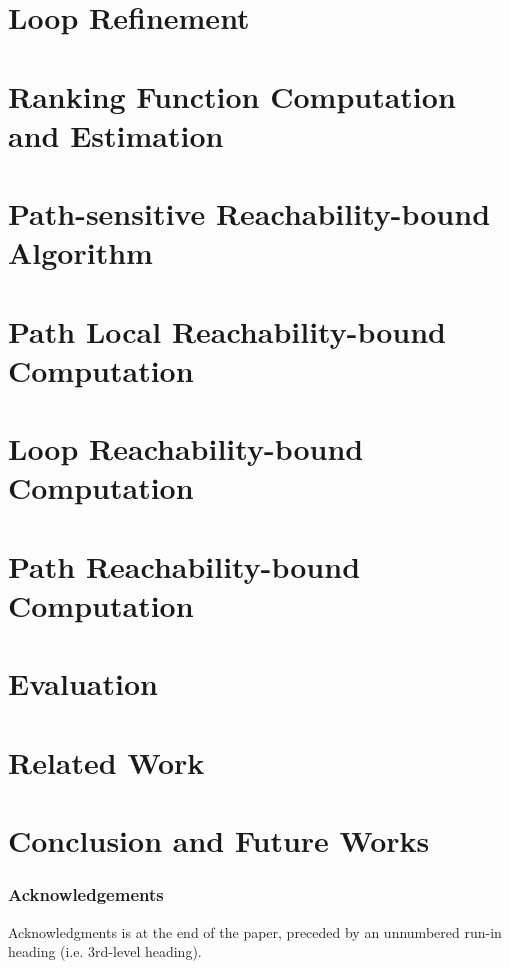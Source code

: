 \documentclass[runningheads]{llncs}
\begin{document}
\section{Loop Refinement}
\label{sec:refine}

\section{Ranking Function Computation and Estimation}
\label{sec:rank}

\section{Path-sensitive Reachability-bound Algorithm}
\label{sec:psrb}

\section{Path Local Reachability-bound Computation}
\label{sec:pathlocalrb}

\section{Loop Reachability-bound Computation}
\label{sec:looprb}

% 
\section{Path Reachability-bound Computation}
\label{sec:pathrb}


% 

\section{Evaluation}
\label{sec:eval}

\section{Related Work}
\label{sec:relatedwork}

%
\section{Conclusion and Future Works}
\label{sec:conlusion}

\clearpage

\subsubsection*{Acknowledgements}
Acknowledgments is at the end of the paper, preceded by an unnumbered run-in heading (i.e.
3rd-level heading).

%
%
%


%
\end{document}
